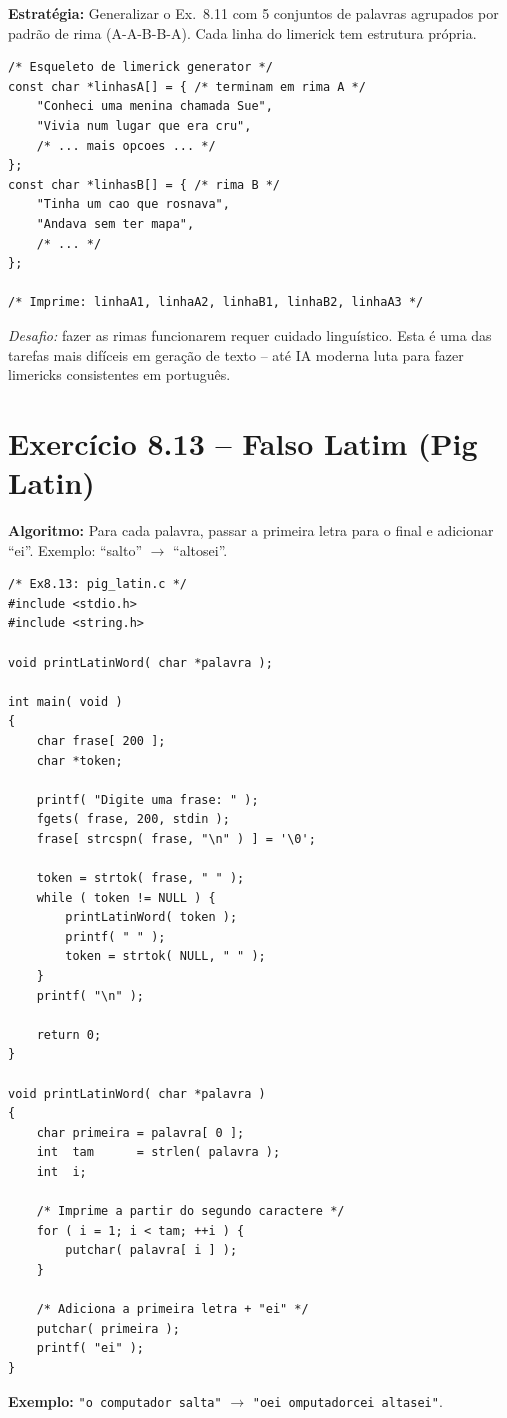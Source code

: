 \documentclass[12pt,a4paper]{article}
\begin{document}
\begin{respostabox}
\textbf{Estratégia:} Generalizar o Ex.~8.11 com 5 conjuntos de palavras agrupados
por padrão de rima (A-A-B-B-A). Cada linha do limerick tem estrutura própria.

\begin{lstlisting}
/* Esqueleto de limerick generator */
const char *linhasA[] = { /* terminam em rima A */
    "Conheci uma menina chamada Sue",
    "Vivia num lugar que era cru",
    /* ... mais opcoes ... */
};
const char *linhasB[] = { /* rima B */
    "Tinha um cao que rosnava",
    "Andava sem ter mapa",
    /* ... */
};

/* Imprime: linhaA1, linhaA2, linhaB1, linhaB2, linhaA3 */
\end{lstlisting}

\textit{Desafio:} fazer as rimas funcionarem requer cuidado linguístico. Esta é
uma das tarefas mais difíceis em geração de texto -- até IA moderna luta para
fazer limericks consistentes em português.
\end{respostabox}

\newpage

\section{Exercício 8.13 -- Falso Latim (Pig Latin)}

\begin{respostabox}
\textbf{Algoritmo:} Para cada palavra, passar a primeira letra para o final e
adicionar ``ei''. Exemplo: ``salto'' $\to$ ``altosei''.

\begin{lstlisting}
/* Ex8.13: pig_latin.c */
#include <stdio.h>
#include <string.h>

void printLatinWord( char *palavra );

int main( void )
{
    char frase[ 200 ];
    char *token;

    printf( "Digite uma frase: " );
    fgets( frase, 200, stdin );
    frase[ strcspn( frase, "\n" ) ] = '\0';

    token = strtok( frase, " " );
    while ( token != NULL ) {
        printLatinWord( token );
        printf( " " );
        token = strtok( NULL, " " );
    }
    printf( "\n" );

    return 0;
}

void printLatinWord( char *palavra )
{
    char primeira = palavra[ 0 ];
    int  tam      = strlen( palavra );
    int  i;

    /* Imprime a partir do segundo caractere */
    for ( i = 1; i < tam; ++i ) {
        putchar( palavra[ i ] );
    }

    /* Adiciona a primeira letra + "ei" */
    putchar( primeira );
    printf( "ei" );
}
\end{lstlisting}

\textbf{Exemplo:} \texttt{"o computador salta"} $\to$ \texttt{"oei omputadorcei altasei"}.
\end{respostabox}
\end{document}
